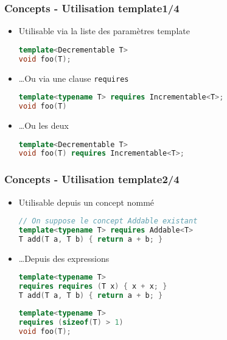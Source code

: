 \documentclass[C++.tex]{subfiles}
\begin{document}
\begin{frame}[fragile]
	\frametitle{Concepts - Utilisation template\titlehfill{}1/4}
	\begin{itemize}
		\item Utilisable via la liste des paramètres template

		\begin{lstlisting}[language=C++]
template<Decrementable T>
void foo(T);\end{lstlisting}

		\item \ldots Ou via une clause \lstinline|requires|


		\begin{lstlisting}[language=C++]
template<typename T> requires Incrementable<T>;
void foo(T)\end{lstlisting}

		\item \ldots Ou les deux

		\begin{lstlisting}[language=C++]
template<Decrementable T>
void foo(T) requires Incrementable<T>;\end{lstlisting}
	\end{itemize}
\end{frame}

\begin{frame}[fragile]
	\frametitle{Concepts - Utilisation template\titlehfill{}2/4}
	\begin{itemize}
		\item Utilisable depuis un concept nommé

		\begin{lstlisting}[language=C++]
// On suppose le concept Addable existant
template<typename T> requires Addable<T>
T add(T a, T b) { return a + b; }\end{lstlisting}

		\item \ldots Depuis des expressions
 
		\begin{lstlisting}[language=C++]
template<typename T>
requires requires (T x) { x + x; }
T add(T a, T b) { return a + b; }\end{lstlisting}

		\begin{lstlisting}[language=C++]
template<typename T>
requires (sizeof(T) > 1)
void foo(T);\end{lstlisting}

	\end{itemize}
\end{frame}
\end{document}
